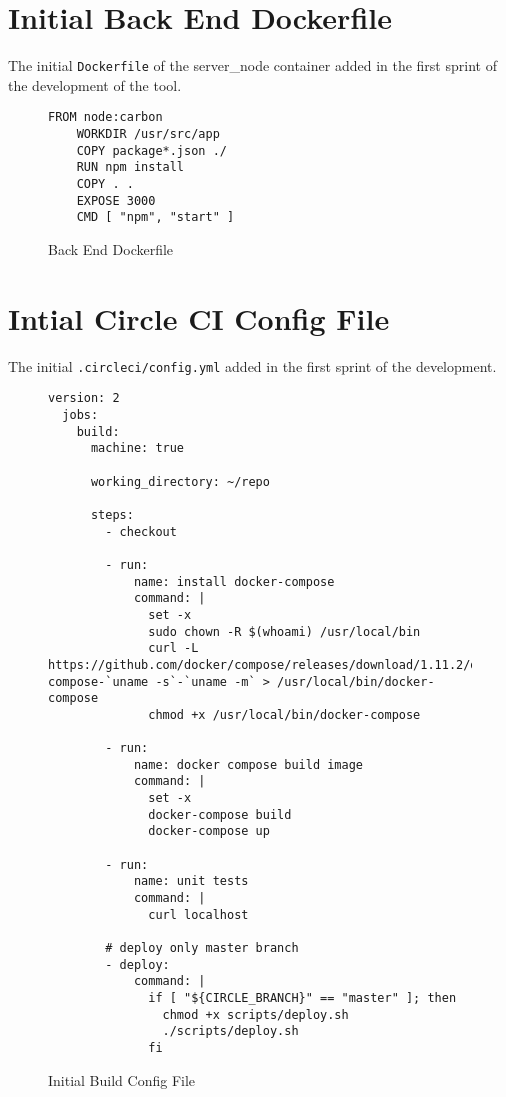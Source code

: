 \newpage
\section{Initial Back End Dockerfile}
The initial \texttt{Dockerfile} of the server\_node container added in the first sprint of
the development of the tool.

\begin{figure}[h!]
    \begin{lstlisting}[basicstyle=\small]
    FROM node:carbon
    WORKDIR /usr/src/app
    COPY package*.json ./
    RUN npm install
    COPY . .
    EXPOSE 3000
    CMD [ "npm", "start" ]
  \end{lstlisting}
  \caption{Back End Dockerfile}
  \label{sample:serverdocker}
\end{figure}

\newpage
\section{Intial Circle CI Config File}
The initial \texttt{.circleci/config.yml} added in the first sprint of the development.

\begin{figure}[h!]
  \begin{lstlisting}[basicstyle=\small, breaklines=true]
  version: 2
  jobs:
    build:
      machine: true

      working_directory: ~/repo

      steps:
        - checkout

        - run:
            name: install docker-compose
            command: |
              set -x
              sudo chown -R $(whoami) /usr/local/bin
              curl -L https://github.com/docker/compose/releases/download/1.11.2/docker-compose-`uname -s`-`uname -m` > /usr/local/bin/docker-compose
              chmod +x /usr/local/bin/docker-compose

        - run:
            name: docker compose build image
            command: |
              set -x
              docker-compose build
              docker-compose up

        - run:
            name: unit tests
            command: |
              curl localhost

        # deploy only master branch
        - deploy:
            command: |
              if [ "${CIRCLE_BRANCH}" == "master" ]; then
                chmod +x scripts/deploy.sh
                ./scripts/deploy.sh
              fi
  \end{lstlisting}
  \caption{Initial Build Config File}
  \label{sample:circleci}
\end{figure}

